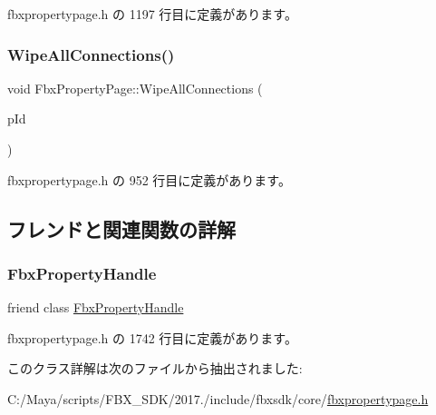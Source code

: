  fbxpropertypage.\+h の 1197 行目に定義があります。

\mbox{\label{class_fbx_property_page_a21b12eedb243bcf7b0d587c476b4c472}} 
\subsubsection{\texorpdfstring{Wipe\+All\+Connections()}{WipeAllConnections()}}
{\footnotesize\ttfamily void Fbx\+Property\+Page\+::\+Wipe\+All\+Connections (\begin{DoxyParamCaption}\item[{\hyperlink{fbxtypes_8h_a088fa96de3b0b3ea69f0f6afef525dfb}{Fbx\+Int}}]{p\+Id }\end{DoxyParamCaption})\hspace{0.3cm}{\ttfamily [inline]}}



 fbxpropertypage.\+h の 952 行目に定義があります。



\subsection{フレンドと関連関数の詳解}
\mbox{\label{class_fbx_property_page_a22125c271a14844d33fa71927b100f2d}} 
\subsubsection{\texorpdfstring{Fbx\+Property\+Handle}{FbxPropertyHandle}}
{\footnotesize\ttfamily friend class \hyperlink{class_fbx_property_handle}{Fbx\+Property\+Handle}\hspace{0.3cm}{\ttfamily [friend]}}



 fbxpropertypage.\+h の 1742 行目に定義があります。



このクラス詳解は次のファイルから抽出されました\+:\begin{DoxyCompactItemize}
\item 
C\+:/\+Maya/scripts/\+F\+B\+X\+\_\+\+S\+D\+K/2017./include/fbxsdk/core/\hyperlink{fbxpropertypage_8h}{fbxpropertypage.\+h}\end{DoxyCompactItemize}
